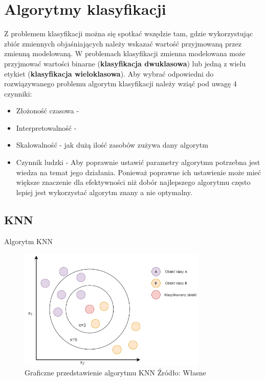 \section{Algorytmy klasyfikacji}
Z problemem klasyfikacji można się spotkać wszędzie tam, gdzie wykorzystując
zbiór zmiennych objaśniających należy wskazać wartość przyjmowaną przez zmienną
modelowaną. W problemach klasyfikacji zmienna modelowana może przyjmować wartości
binarne (\textbf{klasyfikacja dwuklasowa}) lub jedną z wielu etykiet (\textbf{klasyfikacja wieloklasowa}).
Aby wybrać odpowiedni do rozwiązywanego problemu algorytm klasyfikacji należy wziąć 
pod uwagę 4 czynniki:
\begin{itemize}
    \item Złożoność czasowa -
    \item Interpretowalność - 
    \item Skalowalność - jak dużą ilość zasobów zużywa dany algorytm 
    \item Czynnik ludzki - Aby poprawnie ustawić parametry algorytmu potrzebna
    jest wiedza na temat jego działania. Ponieważ poprawne ich ustawienie może 
    mieć większe znaczenie dla efektywności niż dobór najlepszego algorytmu często
    lepiej jest wykorzystać algorytm znany a nie optymalny.
\end{itemize}
\subsection{KNN}
Algorytm KNN
\begin{figure}[H]
    \centering
    \includegraphics[width=0.8\textwidth]{./Img/KNN.png}
    \caption{Graficzne przedstawienie algorytmu KNN Źródło: Własne}
\end{figure}
